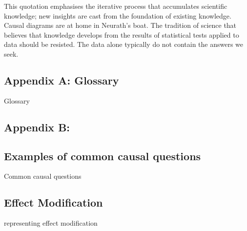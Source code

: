 \documentclass[
  single column]{article}
\begin{document}
This quotation emphasises the iterative process that accumulates
scientific knowledge; new insights are cast from the foundation of
existing knowledge. Causal diagrams are at home in Neurath's boat. The
tradition of science that believes that knowledge develops from the
results of statistical tests applied to data should be resisted. The
data alone typically do not contain the answers we seek.

\newpage{}

\subsection{Appendix A: Glossary}\label{appendix-a-glossary}

\begin{table}

\caption{\label{tbl-experiments}Glossary}

\centering{

\glossaryTerms

}

\end{table}%

\subsection{Appendix B:}\label{appendix-b}

\subsection{Examples of common causal
questions}\label{examples-of-common-causal-questions}

\begin{table}

\caption{\label{tbl-common-interests}Common causal questions}

\centering{

\terminologycommoncausalinterests

}

\end{table}%

\subsection{Effect Modification}\label{effect-modification}

\begin{table}

\caption{\label{tbl-common-interests}representing effect modification}

\centering{

\terminologyeffectmodification

}

\end{table}%
\end{document}

